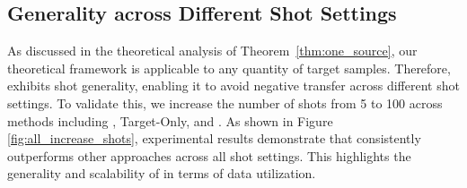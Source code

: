 \subsection{Generality across Different Shot Settings}
As discussed in the theoretical analysis of Theorem~\ref{thm:one_source}, our theoretical framework is applicable to any quantity of target samples. Therefore, \ourmethod{} exhibits shot generality, enabling it to avoid negative transfer across different shot settings.
To validate this, we increase the number of shots from 5 to 100 across methods including \allsource{}, Target-Only, and \ourmethod{}. 
As shown in Figure \ref{fig:all_increase_shots}, experimental results demonstrate that \ourmethod{} consistently outperforms other approaches across all shot settings. This highlights the generality and scalability of \ourmethod{} in terms of data utilization. %


